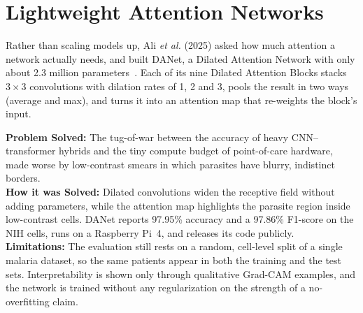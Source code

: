 \documentclass[conference]{IEEEtran}
\begin{document}
\section{Lightweight Attention Networks}\label{sec:danet}
Rather than scaling models up, Ali \emph{et al.} (2025) asked how much attention a
network actually needs, and built DANet, a Dilated Attention Network with only about
2.3 million parameters~\cite{ali2025danet}. Each of its nine Dilated Attention Blocks
stacks $3\times3$ convolutions with dilation rates of 1, 2 and 3, pools the result in
two ways (average and max), and turns it into an attention map that re-weights the
block's input.

\textbf{Problem Solved:} The tug-of-war between the accuracy of heavy CNN--transformer
hybrids and the tiny compute budget of point-of-care hardware, made worse by
low-contrast smears in which parasites have blurry, indistinct borders.\\
\textbf{How it was Solved:} Dilated convolutions widen the receptive field without
adding parameters, while the attention map highlights the parasite region inside
low-contrast cells. DANet reports 97.95\% accuracy and a 97.86\% F1-score on the NIH
cells, runs on a Raspberry Pi~4, and releases its code publicly.\\
\textbf{Limitations:} The evaluation still rests on a random, cell-level split of a
single malaria dataset, so the same patients appear in both the training and the test
sets. Interpretability is shown only through qualitative Grad-CAM examples, and the
network is trained without any regularization on the strength of a no-overfitting
claim.
\end{document}
